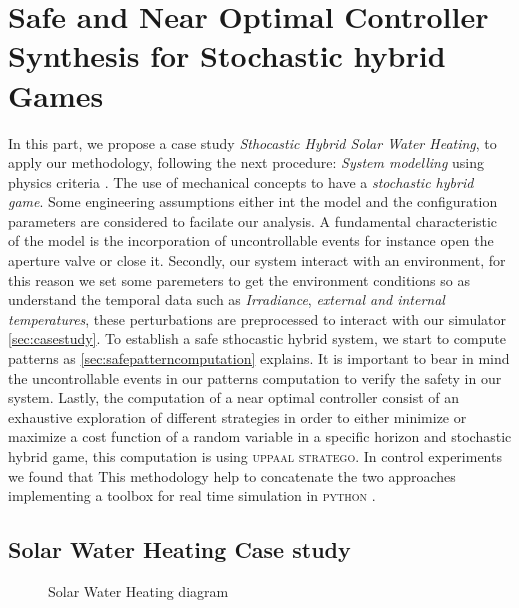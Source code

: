 \chapter{Safe and Near Optimal Controller Synthesis for Stochastic hybrid Games}
  \label{ch:proposal} %
  In this part, we propose a case study \emph{Sthocastic Hybrid Solar Water
  Heating}, to apply our methodology, following the next procedure:
  \emph{System modelling} using physics criteria \cite{tsilingiris1996solar}. The use of
  mechanical concepts to have a \emph{stochastic
  hybrid game}. Some engineering assumptions either int the model and
  the configuration parameters are considered to facilate our analysis.
  A fundamental characteristic  of the model is the incorporation 
  of uncontrollable events for instance open the aperture valve or
  close it. 
  Secondly, our system interact with an environment, for this reason 
  we set some paremeters to get the environment conditions so as 
  understand the temporal data such as \emph{Irradiance}, \emph{external and 
  internal temperatures}, these perturbations are preprocessed to interact
  with our simulator \autoref{sec:casestudy}. To establish a safe sthocastic hybrid system, we start to compute patterns as
  \autoref{sec:safepatterncomputation} explains. It is important to bear in mind
  the uncontrollable events in our patterns computation to verify the safety
  in our system.
  Lastly, the computation of a near optimal controller consist of an 
  exhaustive exploration of different strategies in order to either
  minimize or maximize a cost function of a random variable in a 
  specific horizon and stochastic hybrid game, this computation is 
  using \textsc{uppaal stratego}. In control experiments we found that
  This methodology help to concatenate the two approaches implementing
  a toolbox for real time simulation in \textsc{python} \cite{larsen2016online}.
  \clearpage

  \section{Solar Water Heating Case study}
    \label{sec:casestudy}

    \begin{figure}[!hbt]
      
      \caption{Solar Water Heating diagram}
      \label{fig:casestudy}
    \end{figure}

